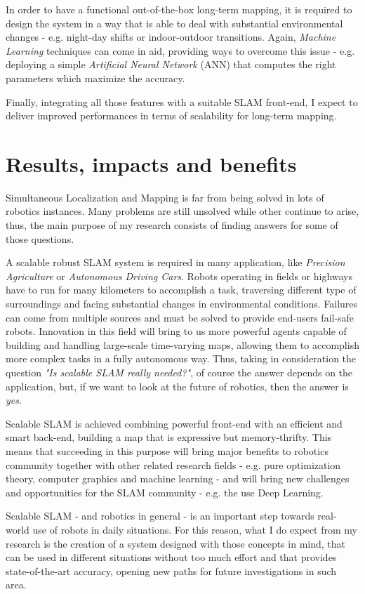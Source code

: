 \documentclass[10pt,a4paper, notitlepage]{report}
\begin{document}
In order to have a functional out-of-the-box long-term mapping, it is required to design the system in a way that is able to deal with substantial environmental changes - e.g. night-day shifts or indoor-outdoor transitions. Again, \textit{Machine Learning} techniques can come in aid, providing ways to overcome this issue - e.g. deploying a simple \textit{Artificial Neural Network} (ANN) that computes the right parameters which maximize the accuracy.

Finally, integrating all those features with a suitable SLAM front-end, I expect to deliver improved performances in terms of scalability for long-term mapping.

\section*{Results, impacts and benefits}
Simultaneous Localization and Mapping is far from being solved in lots of robotics instances. Many problems are still unsolved while other continue to arise, thus, the main purpose of my research consists of finding answers for some of those questions. 

A scalable robust SLAM system is required in many application, like \textit{Precision Agriculture} or \textit{Autonomous Driving Cars}. Robots operating in fields or highways have to run for many kilometers to accomplish a task, traversing different type of surroundings and facing substantial changes in environmental conditions. Failures can come from multiple sources and must be solved to provide end-users fail-safe robots. Innovation in this field will bring to us more powerful agents capable of building and handling large-scale time-varying maps, allowing them to accomplish more complex tasks in a fully autonomous way. Thus, taking in consideration the question \textit{"Is scalable SLAM really needed?"}, of course the answer depends on the application, but, if we want to look at the future of robotics, then the answer is \textit{yes}.

Scalable SLAM is achieved combining powerful front-end with an efficient and smart back-end, building a map that is expressive but memory-thrifty. This means that succeeding in this purpose will bring major benefits to robotics community together with other related research fields - e.g. pure optimization theory, computer graphics and machine learning -  and will bring new challenges and opportunities for the SLAM community - e.g. the use Deep Learning. 

\vspace{15px}

Scalable SLAM - and robotics in general - is an important step towards real-world use of robots in daily situations. For this reason, what I do expect from my research is the creation of a system designed with those concepts in mind, that can be used in different situations without too much effort and that provides state-of-the-art accuracy, opening new paths for future investigations in such area.






\end{document}
